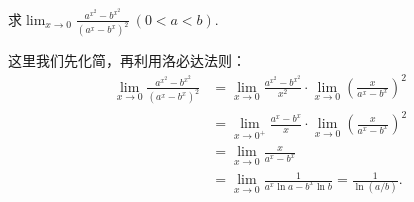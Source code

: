 \begin{example}
求\(\lim_{x\to0} \frac{a^{x^2}-b^{x^2}}{(a^x-b^x)^2}\ (0<a<b)\).
\begin{solution}
这里我们先化简，再利用洛必达法则：\begin{align*}
	\lim_{x\to0} \frac{a^{x^2}-b^{x^2}}{(a^x-b^x)^2}
	&= \lim_{x\to0} \frac{a^{x^2}-b^{x^2}}{x^2}
		\cdot \lim_{x\to0} \left(\frac{x}{a^x-b^x}\right)^2 \\
	&= \lim_{x\to0^+} \frac{a^x-b^x}{x}
		\cdot \lim_{x\to0} \left(\frac{x}{a^x-b^x}\right)^2 \\
	&= \lim_{x\to0} \frac{x}{a^x-b^x} \\
	&= \lim_{x\to0} \frac{1}{a^x \ln a - b^x \ln b}
	= \frac{1}{\ln(a/b)}.
\end{align*}
\end{solution}
\end{example}
